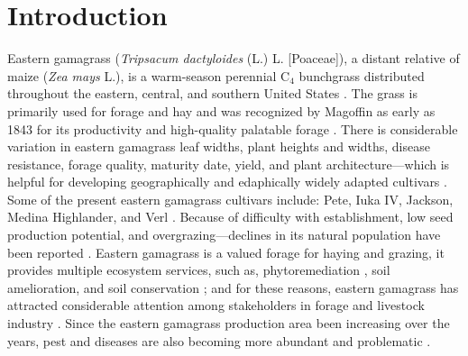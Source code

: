 \documentclass[agronomy,article,submit,moreauthors,pdftex,10pt,a4paper]{mdpi}
\theoremstyle{mdpi}
\newcounter{ex}
\newcounter{re}
\theoremstyle{mdpidefinition}
\begin{document}



\section{Introduction}

Eastern gamagrass (\textit{Tripsacum dactyloides} (L.) L. [Poaceae]), a distant relative of maize (\textit{Zea mays} L.), is a warm-season perennial C${_4}$ bunchgrass distributed throughout the eastern, central, and southern United States \cite{ref-barkworth07,hitchcock}. The grass is primarily used for forage and hay and was recognized by Magoffin as early as 1843 for its productivity and high-quality palatable forage \cite{hitchcock1899}. There is considerable variation in eastern gamagrass leaf widths, plant heights and widths, disease resistance, forage quality, maturity date, yield, and plant architecture---which is helpful for developing geographically and edaphically widely adapted cultivars \cite{salon2000}. Some of the present eastern gamagrass cultivars include: Pete, Iuka IV, Jackson, Medina Highlander, and Verl \cite{springer04,springer06}. Because of difficulty with establishment, low seed production potential, and overgrazing---declines in its natural population have been reported \cite{rechenthin1951}. Eastern gamagrass is a valued forage for haying and grazing, it provides multiple ecosystem services, such as, phytoremediation \cite{euliss08}, soil amelioration, and soil conservation \cite{gilker02}; and for these reasons, eastern gamagrass has attracted considerable attention among stakeholders in forage and livestock industry \cite{springer04}. Since the eastern gamagrass production area been increasing over the years, pest and diseases are also becoming more abundant and problematic \cite{springer04}.
\end{document}
